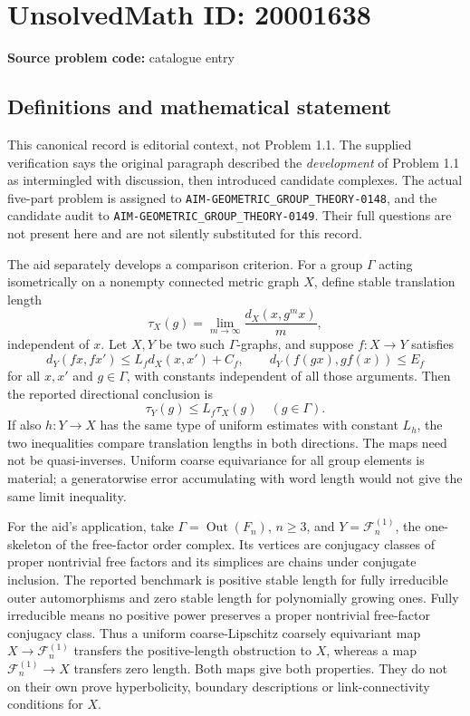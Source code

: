 \documentclass[11pt]{article}
\begin{document}
\section*{UnsolvedMath ID: 20001638}
\textbf{Source problem code:} catalogue entry
\subsection{Definitions and mathematical statement}
This canonical record is editorial context, not Problem 1.1. The supplied verification says the original paragraph described the \emph{development} of Problem 1.1 as intermingled with discussion, then introduced candidate complexes. The actual five-part problem is assigned to \texttt{AIM-GEOMETRIC\_GROUP\_THEORY-0148}, and the candidate audit to \texttt{AIM-GEOMETRIC\_GROUP\_THEORY-0149}. Their full questions are not present here and are not silently substituted for this record.

The aid separately develops a comparison criterion. For a group \(\Gamma\) acting isometrically on a nonempty connected metric graph \(X\), define stable translation length
\[
 \tau_X(g)=\lim_{m\to\infty}\frac{d_X(x,g^m x)}m,
\]
independent of \(x\). Let \(X,Y\) be two such \(\Gamma\)-graphs, and suppose \(f:X\to Y\) satisfies
\[
 d_Y(fx,fx')\leq L_fd_X(x,x')+C_f,\qquad
 d_Y(f(gx),g f(x))\leq E_f
\]
for all \(x,x'\) and \(g\in\Gamma\), with constants independent of all those arguments. Then the reported directional conclusion is
\[
 \tau_Y(g)\leq L_f\tau_X(g)\quad(g\in\Gamma).
\]
If also \(h:Y\to X\) has the same type of uniform estimates with constant \(L_h\), the two inequalities compare translation lengths in both directions. The maps need not be quasi-inverses. Uniform coarse equivariance for all group elements is material; a generatorwise error accumulating with word length would not give the same limit inequality.

For the aid's application, take \(\Gamma=\operatorname{Out}(F_n)\), \(n\geq3\), and \(Y=\mathcal F_n^{(1)}\), the one-skeleton of the free-factor order complex. Its vertices are conjugacy classes of proper nontrivial free factors and its simplices are chains under conjugate inclusion. The reported benchmark is positive stable length for fully irreducible outer automorphisms and zero stable length for polynomially growing ones. Fully irreducible means no positive power preserves a proper nontrivial free-factor conjugacy class. Thus a uniform coarse-Lipschitz coarsely equivariant map
\(X\to\mathcal F_n^{(1)}\)
transfers the positive-length obstruction to \(X\), whereas a map
\(\mathcal F_n^{(1)}\to X\)
transfers zero length. Both maps give both properties. They do not on their own prove hyperbolicity, boundary descriptions or link-connectivity conditions for \(X\).
\end{document}
